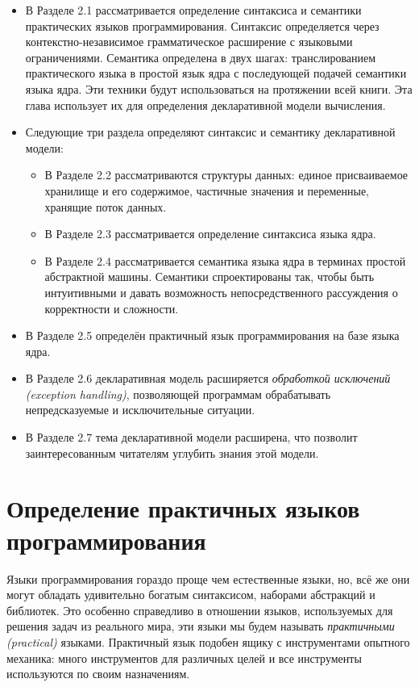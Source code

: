 \begin{itemize}
\item{В Разделе 2.1 рассматривается определение синтаксиса и семантики практических языков программирования. Синтаксис определяется через контекстно-независимое грамматическое расширение с языковыми ограничениями. Семантика определена в двух шагах: транслированием практического языка в простой язык ядра с последующей подачей семантики языка ядра. Эти техники будут использоваться на протяжении всей книги. Эта глава использует их для определения декларативной модели вычисления.}

\item{Следующие три раздела определяют синтаксис и семантику декларативной модели:

  \begin{itemize}
\item{В Разделе 2.2 рассматриваются структуры данных: единое присваиваемое хранилище и его содержимое, частичные значения и переменные, хранящие поток данных.}

\item{В Разделе 2.3 рассматривается определение синтаксиса языка ядра.}

\item{В Разделе 2.4 рассматривается семантика языка ядра в терминах простой абстрактной машины. Семантики спроектированы так, чтобы быть интуитивными и давать возможность непосредственного рассуждения о корректности и сложности.}
  \end{itemize}
}

\item{В Разделе 2.5 определён практичный язык программирования на базе языка ядра.}

\item{В Разделе 2.6 декларативная модель расширяется \emph{обработкой исключений (exception handling)}, позволяющей программам обрабатывать непредсказуемые и исключительные ситуации.}

\item{В Разделе 2.7 тема декларативной модели расширена, что позволит заинтересованным читателям углубить знания этой модели.}
\end{itemize}

\section{Определение практичных языков программирования}

Языки программирования гораздо проще чем естественные языки, но, всё же они могут обладать удивительно богатым синтаксисом, наборами абстракций и библиотек. Это особенно справедливо в отношении языков, используемых для решения задач из реального мира, эти языки мы будем называть \emph{практичными (practical)} языками. Практичный язык подобен ящику с инструментами опытного механика: много инструментов для различных целей и все инструменты используются по своим назначениям.

